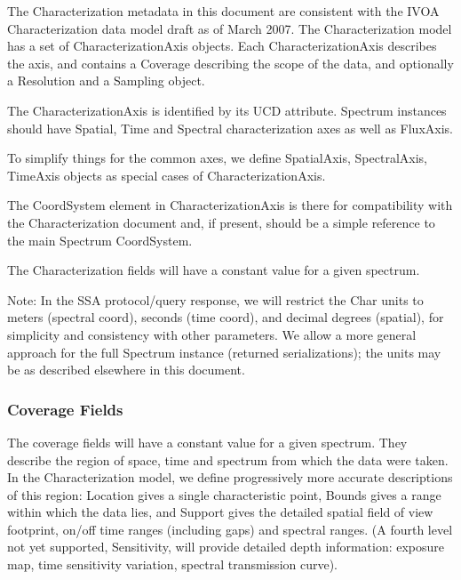 \documentclass[11pt]{article}
\begin{document}
The Characterization metadata in this document are consistent with
the IVOA Characterization
data model draft as of March 2007. The Characterization model has
a set of CharacterizationAxis objects.  Each CharacterizationAxis
describes
the axis, and contains a Coverage describing the scope of the data, and optionally
a Resolution and a Sampling object. 

The CharacterizationAxis is identified by its UCD attribute.
Spectrum instances should have Spatial, Time and Spectral characterization axes
as well as FluxAxis.


To simplify things for the common axes, we define SpatialAxis, SpectralAxis,
TimeAxis objects as special cases of CharacterizationAxis.

The CoordSystem element in CharacterizationAxis is there for
compatibility with the Characterization document and, if present, should be a simple
reference to the main Spectrum CoordSystem.

The Characterization fields will have a constant value for a given spectrum.

Note: In the SSA protocol/query response, we
will restrict the Char units to meters (spectral coord),
seconds (time coord), and decimal degrees (spatial),
for simplicity and consistency with other parameters.
We allow a more general approach for the full Spectrum 
instance (returned serializations); the units may be
as described elsewhere in this document.


\subsubsection{Coverage Fields}
                        

The coverage fields will have a constant value for a given spectrum.
They describe the region of space, time and spectrum from which the data
were taken. In the Characterization model, we define progressively more
accurate descriptions of this region: Location gives a single
characteristic point, Bounds gives a range within which the data lies,
and Support gives the detailed spatial field of view footprint, on/off
time ranges (including gaps) and spectral ranges. (A fourth level not
yet supported, Sensitivity, will provide detailed depth information:
exposure map, time sensitivity variation, spectral transmission curve).
  
\end{document}

